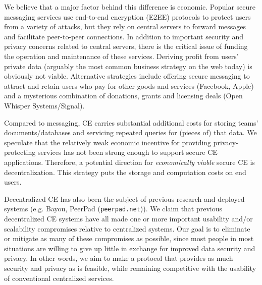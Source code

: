 \documentclass[runningheads]{llncs}
\begin{document}

We believe that a major factor behind this difference is economic.
Popular secure messaging services use end-to-end encryption (E2EE) protocols to protect users from a variety of attacks, but they rely on central servers to forward messages and facilitate peer-to-peer connections.
In addition to important security and privacy concerns related to central servers, there is the critical issue of funding the operation and maintenance of these services.
Deriving profit from users' private data (arguably the most common business strategy on the web today) is obviously not viable.
Alternative strategies include offering secure messaging to attract and retain users who pay for other goods and services (Facebook, Apple) and a mysterious combination of donations, grants and licensing deals (Open Whisper Systems/Signal).

Compared to messaging, CE carries substantial additional costs for storing teams' documents{\slash}databases and servicing repeated queries for (pieces of) that data.
We speculate that the relatively weak economic incentive for providing privacy-protecting services has not been strong enough to support secure CE applications.
Therefore, a potential direction for \emph{economically viable} secure CE is decentralization.
This strategy puts the storage and computation costs on end users.\footnotemark{}


Decentralized CE has also been the subject of previous research and deployed systems (e.g. Bayou\cite{Terry1995}, PeerPad (\texttt{peerpad.net})).
We claim that previous decentralized CE systems have all made one or more important usability and/or scalability compromises relative to centralized systems.
Our goal is to eliminate or mitigate as many of these compromises as possible, since most people in most situations are willing to give up little in exchange for improved data security and privacy.
In other words, we aim to make a protocol that provides as much security and privacy as is feasible, while remaining competitive with the usability of conventional centralized services.
\end{document}
